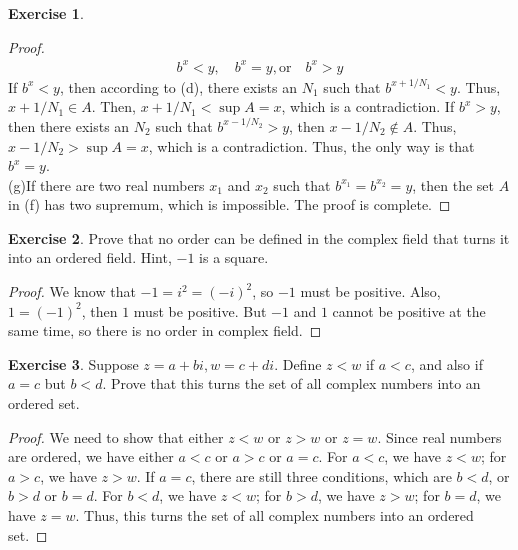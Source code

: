 \documentclass[12pt]{extarticle}
\newcommand{\<}{\langle}
\renewcommand{\>}{\rangle}
\theoremstyle{definition}
\newtheorem{exercise}{Exercise}
\begin{document}
\begin{exercise}
\begin{proof}
\begin{align*}
    b^x < y, \quad b^x = y, \text{or} \quad b^x > y
\end{align*}
If $b^x<y$, then according to (d), there exists an $N_1$ such that $b^{x+1/N_1}<y$. Thus, $x+1/N_1 \in A$. Then, $x+1/N_1 < \sup A = x$, which is a contradiction. If $b^x>y$, then there exists an $N_2$ such that $b^{x-1/N_2}>y$, then $x-1/N_2 \notin A$. Thus, $x-1/N_2 > \sup A = x$, which is a contradiction. Thus, the only way is that $b^x = y$. \\
\hspace*{3em}(g)If there are two real numbers $x_1$ and $x_2$ such that $b^{x_1} = b^{x_2} = y$, then the set $A$ in (f) has two supremum, which is impossible. The proof is complete.
\end{proof}
\end{exercise}

\medskip

\begin{exercise}
Prove that no order can be defined in the complex field that turns it into an ordered field. Hint, $-1$ is a square.
\end{exercise}
\begin{proof}
We know that $-1 = i^2 = (-i)^2$, so $-1$ must be positive. Also, $1 = (-1)^2$, then $1$ must be positive. But $-1$ and $1$ cannot be positive at the same time, so there is no order in complex field. 
\end{proof}

\medskip

\begin{exercise}
Suppose $z=a+bi, w=c+di$. Define $z<w$ if $a<c$, and also if $a=c$ but $b<d$. Prove that this turns the set of all complex numbers into an ordered set.
\end{exercise}
\begin{proof}
We need to show that either $z<w$ or $z>w$ or $z=w$. Since real numbers are ordered, we have either $a<c$ or $a>c$ or $a=c$. For $a<c$, we have $z<w$; for $a>c$, we have $z>w$. If $a=c$, there are still three conditions, which are $b<d$, or $b>d$ or $b=d$. For $b<d$, we have $z<w$; for $b>d$, we have $z>w$; for $b=d$, we have $z=w$. Thus, this turns the set of all complex numbers into an ordered set.
\end{proof}
\end{document}
